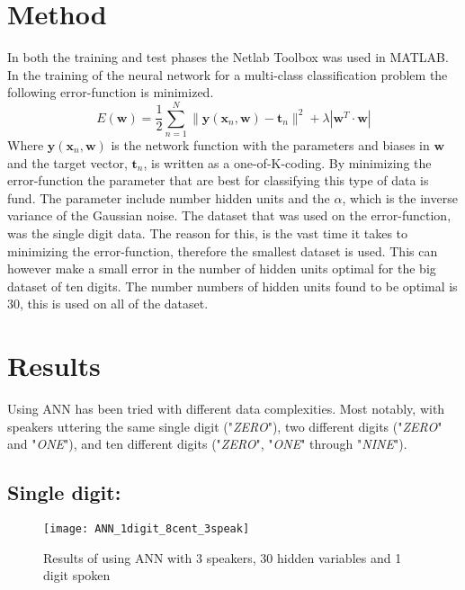 \section{Method}
In both the training and test phases the Netlab Toolbox  was used in MATLAB.
In the training of the neural network for a multi-class classification problem the following error-function is minimized.
\begin{equation}
E(\mathbf{w}) = \dfrac{1}{2} \sum_{n=1}^{N}\| \mathbf{y}(\mathbf{x}_n,\mathbf{w})-\mathbf{t}_n \|^2+\lambda| \mathbf{w}^T \cdot \mathbf{w}|
\label{eq:ANN_error}
\end{equation}
Where $ \mathbf{y}(\mathbf{x}_n,\mathbf{w}) $ is the network function with the parameters and biases in $ \mathbf{w} $ and the target vector, $ \mathbf{t}_n $, is written as a one-of-K-coding.
By minimizing the error-function the parameter that are best for classifying this type of data is fund. 
The parameter include number hidden units and the $\alpha$, which is the inverse variance of the Gaussian noise.
The dataset that was used on the error-function, was the single digit data.
The reason for this, is the vast time it takes to minimizing the error-function, therefore the smallest dataset is used.
This can however make a small error in the number of hidden units optimal for the big dataset of ten digits. 
The number numbers of hidden units found to be optimal is 30, this is used on all of the dataset.

\section{Results}
Using ANN has been tried with different data complexities.
Most notably, with speakers uttering the same single digit ("\textit{ZERO}"), two different digits ("\textit{ZERO}" and "\textit{ONE}"), and ten different digits ("\textit{ZERO}", "\textit{ONE}" through "\textit{NINE}").

\subsection{Single digit:}
\begin{figure}[H]
\centering
\texttt{[image: ANN\_1digit\_8cent\_3speak]}
\caption{Results of using ANN with 3 speakers, 30 hidden variables and 1 digit spoken}
\label{fig:ANN_fig_1}
\end{figure}

